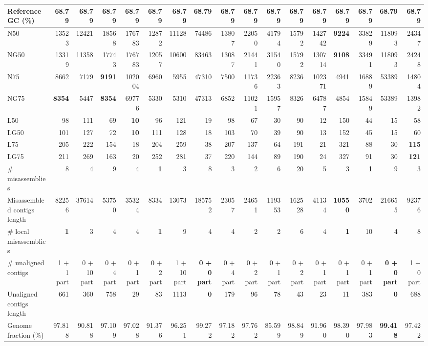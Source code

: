 \documentclass[12pt,a4paper]{article}
\begin{document}
\begin{table}[ht]
\begin{center}
\begin{tabular}{|l*{16}{|r}|}
Reference GC (\%) & 68.79 & 68.79 & 68.79 & 68.79 & 68.79 & 68.79 & 68.79 & 68.79 & 68.79 & 68.79 & 68.79 & 68.79 & 68.79 & 68.79 & 68.79 & 68.79 \\ \hline
N50 & 13523 & 12421 & 18568 & 176783 & 12872 & 11128 & 74486 & 13807 & 22050 & 41794 & 15792 & 142742 & {\bf 9224} & 33829 & 118093 & 24347 \\ \hline
NG50 & 13319 & 11358 & 17743 & 176783 & 12057 & 10600 & 83463 & 13087 & 21441 & 31540 & 15792 & 130714 & {\bf 9108} & 33491 & 118093 & 24248 \\ \hline
N75 & 8662 & 7179 & {\bf 9191} & 102004 & 6960 & 5955 & 47310 & 7500 & 11736 & 22363 & 8236 & 102371 & 4941 & 16889 & 53389 & 14804 \\ \hline
NG75 & {\bf 8354} & 5447 & {\bf 8354} & 69776 & 5330 & 5310 & 47313 & 6852 & 11021 & 15957 & 8326 & 64787 & 4854 & 15849 & 53389 & 13982 \\ \hline
L50 & 98 & 111 & 69 & {\bf 10} & 96 & 121 & 19 & 98 & 67 & 30 & 90 & 12 & 150 & 44 & 15 & 58 \\ \hline
LG50 & 101 & 127 & 72 & {\bf 10} & 111 & 128 & 18 & 103 & 70 & 39 & 90 & 13 & 152 & 45 & 15 & 60 \\ \hline
L75 & 205 & 222 & 154 & 18 & 204 & 259 & 38 & 207 & 137 & 64 & 191 & 21 & 321 & 88 & 30 & {\bf 115} \\ \hline
LG75 & 211 & 269 & 163 & 20 & 252 & 281 & 37 & 220 & 144 & 89 & 190 & 24 & 327 & 91 & 30 & {\bf 121} \\ \hline
\# misassemblies & 8 & 4 & 9 & 4 & {\bf 1} & 3 & 8 & 3 & 2 & 6 & 20 & 5 & 3 & {\bf 1} & 9 & 3 \\ \hline
Misassembled contigs length & 82256 & 37614 & 53750 & 35324 & 8334 & 13073 & 185752 & 23057 & 24651 & 119353 & 162528 & 41134 & {\bf 10550} & 3702 & 216655 & 92376 \\ \hline
\# local misassemblies & {\bf 1} & 3 & 4 & 4 & {\bf 1} & 9 & 4 & 4 & 2 & 2 & 6 & 4 & {\bf 1} & 10 & 4 & 8 \\ \hline
\# unaligned contigs & 1 + 1 part & 0 + 10 part & 0 + 4 part & 0 + 1 part & 0 + 2 part & 1 + 10 part & {\bf 0 + 0 part} & 0 + 4 part & 0 + 2 part & 0 + 1 part & 0 + 2 part & 0 + 1 part & 0 + 1 part & 0 + 1 part & {\bf 0 + 0 part} & 1 + 0 part \\ \hline
Unaligned contigs length & 661 & 360 & 758 & 29 & 83 & 1113 & {\bf 0} & 179 & 96 & 78 & 43 & 23 & 11 & 383 & {\bf 0} & 688 \\ \hline
Genome fraction (\%) & 97.818 & 90.818 & 97.109 & 97.028 & 91.376 & 96.251 & 99.272 & 97.182 & 97.762 & 85.599 & 98.849 & 91.960 & 98.390 & 97.983 & {\bf 99.418} & 97.422 \\ \hline

\end{tabular}
\end{center}
\end{table}
\end{document}
